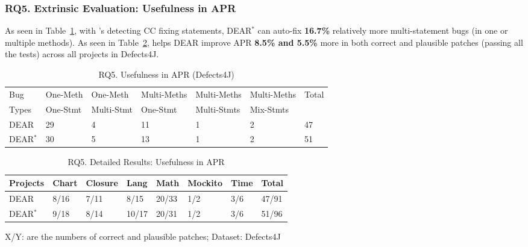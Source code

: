 \subsubsection{\bf RQ5. Extrinsic Evaluation: Usefulness in APR}
As seen in Table~\ref{RQ5_1}, with {\tool}'s detecting CC fixing
statements, DEAR$^{*}$ can auto-fix {\bf 16.7\%} relatively more
multi-statement bugs (in one or multiple methods). As seen in
Table~\ref{RQ5_2}, {\tool} helps DEAR improve APR {\bf 8.5\% and 5.5\%} more in
both correct and plausible patches (passing all the tests) across all
projects in Defects4J.

\begin{table}[t]
	\caption{RQ5. Usefulness in APR (Defects4J)}
	\vspace{-12pt}
	\begin{center}
        \tabcolsep 2pt
		\footnotesize
		\renewcommand{\arraystretch}{1} 
		\begin{tabular}{p{0.7cm}<{\centering}|p{1.1cm}<{\centering}|p{1.1cm}<{\centering}|p{1.3cm}<{\centering}|p{1.3cm}<{\centering}|p{1.3cm}<{\centering}|p{0.7cm}<{\centering}}
			\hline
			Bug & One-Meth & One-Meth & Multi-Meths & Multi-Meths & Multi-Meths & Total\\
			Types          & One-Stmt & Multi-Stmt & One-Stmt & Multi-Stmts & Mix-Stmts & \\\hline
			DEAR & 29 & 4 & 11 & 1 & 2 & 47\\
			DEAR$^{*}$ & 30 & 5 & 13 & 1 & 2 & 51\\ 
			\hline
		\end{tabular}
		\label{RQ5_1}
	\end{center}
\vspace{-5pt}
\end{table}

\begin{table}[t]
	\caption{RQ5. Detailed Results: Usefulness in APR}
	\vspace{-10pt}
	\begin{center}
        \footnotesize
		\renewcommand{\arraystretch}{1} 
		\begin{tabular}{l|p{0.6cm}<{\centering}p{0.6cm}<{\centering}p{0.6cm}<{\centering}p{0.6cm}<{\centering}p{0.8cm}<{\centering}p{0.6cm}<{\centering}|p{0.5cm}<{\centering}}
			\hline
			Projects  & Chart & Closure & Lang & Math & Mockito & Time & Total\\
			\hline
			DEAR  & 8/16  &  7/11     & 8/15 & 20/33 & 1/2     & 3/6  & 47/91\\
		        DEAR$^{*}$ & 9/18  &  8/14     & 10/17 & 20/31 & 1/2     & 3/6  & 51/96\\
			\hline
		\end{tabular}
		
		{\footnotesize X/Y: are the numbers of correct and plausible patches; Dataset: Defects4J}
		\label{RQ5_2}
	\end{center}
\vspace{-5pt}
\end{table}
